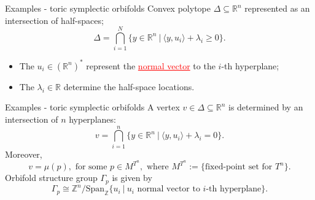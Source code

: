 \documentclass[aspectratio=169,xcolor=dvipsnames]{beamer}
\newcommand{\ZZ}{\mathbb{Z}}
\newcommand{\RR}{\mathbb{R}}
\newcommand{\Span}{\text{Span}}
\begin{document}
\begin{frame}{Examples - toric symplectic orbifolds}
	Convex polytope $\Delta \subseteq \RR^{n}$ represented as an intersection of half-spaces;
	\[
		\Delta = \bigcap_{i=1}^{N} \{ y \in \RR^{n}~|~\langle y, u_{i}\rangle + \lambda_{i} \geq 0 \}.
	\]
	\begin{itemize}
		\item The $u_{i} \in (\RR^{n})^{\ast}$ represent the \textcolor{red}{\underline{normal vector}} to the $i$-th hyperplane;
		\item The $\lambda_{i} \in \RR$ determine the half-space locations.
	\end{itemize}

	\begin{figure}[h!]
		\centering
	\end{figure}
\end{frame}

\begin{frame}{Examples - toric symplectic orbifolds}
	A vertex $v \in \Delta \subseteq \RR^{n}$ is determined by an intersection of $n$ hyperplanes:
	\[
	v = \bigcap_{i=1}^{n} \{ y \in \RR^{n}~|~\langle y, u_{i}\rangle + \lambda_{i} = 0 \}.
	\]
	Moreover,
	\[
		v = \mu(p), \text{ for some } p \in M^{T^{n}}, \text{ where } M^{T^{n}} := \{\text{fixed-point set for } T^{n}\}.
	\]
	Orbifold structure group $\Gamma_{p}$ is given by
	\[
		\Gamma_{p} \cong \ZZ^{n} / \Span_{\ZZ}\{u_{i}~|~u_{i} \text{ normal vector to } i\text{-th hyperplane} \}.
	\]
\end{frame}
\end{document}
